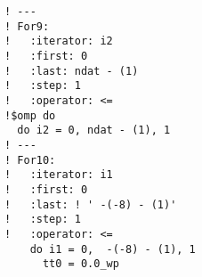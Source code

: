 \begin{lstlisting}[language={[90]Fortran}]
! ---
! For9:
!   :iterator: i2
!   :first: 0
!   :last: ndat - (1)
!   :step: 1
!   :operator: <=
!$omp do 
  do i2 = 0, ndat - (1), 1
! ---
! For10:
!   :iterator: i1
!   :first: 0
!   :last: ! ' -(-8) - (1)'
!   :step: 1
!   :operator: <=
    do i1 = 0,  -(-8) - (1), 1
      tt0 = 0.0_wp
\end{lstlisting}

